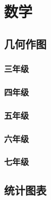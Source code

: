 




\tableofcontents

\newpage

\part{数学}

\chapter{几何作图}

\section*{三年级}


\section*{四年级}


\section*{五年级}


\section*{六年级}


\section*{七年级}


\chapter{统计图表}

